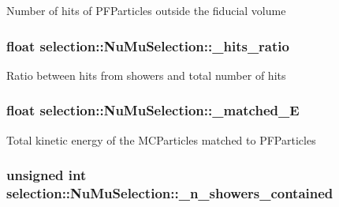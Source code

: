 Number of hits of P\-F\-Particles outside the fiducial volume \hypertarget{classselection_1_1NuMuSelection_a550c6e1bb4c959af5f5724b122b39999}{
\subsubsection[{\-\_\-hits\-\_\-ratio}]{\setlength{\rightskip}{0pt plus 5cm}float selection\-::\-Nu\-Mu\-Selection\-::\-\_\-hits\-\_\-ratio\hspace{0.3cm}{\ttfamily [private]}}}\label{classselection_1_1NuMuSelection_a550c6e1bb4c959af5f5724b122b39999}
Ratio between hits from showers and total number of hits \hypertarget{classselection_1_1NuMuSelection_a47c185ab6ea19a597c0d049359e851e1}{
\subsubsection[{\-\_\-matched\-\_\-\-E}]{\setlength{\rightskip}{0pt plus 5cm}float selection\-::\-Nu\-Mu\-Selection\-::\-\_\-matched\-\_\-\-E\hspace{0.3cm}{\ttfamily [private]}}}\label{classselection_1_1NuMuSelection_a47c185ab6ea19a597c0d049359e851e1}
Total kinetic energy of the M\-C\-Particles matched to P\-F\-Particles \hypertarget{classselection_1_1NuMuSelection_a8583770de84e76b78e7ddfb4b7e733da}{
\subsubsection[{\-\_\-n\-\_\-showers\-\_\-contained}]{\setlength{\rightskip}{0pt plus 5cm}unsigned int selection\-::\-Nu\-Mu\-Selection\-::\-\_\-n\-\_\-showers\-\_\-contained\hspace{0.3cm}{\ttfamily [private]}}}\label{classselection_1_1NuMuSelection_a8583770de84e76b78e7ddfb4b7e733da}
